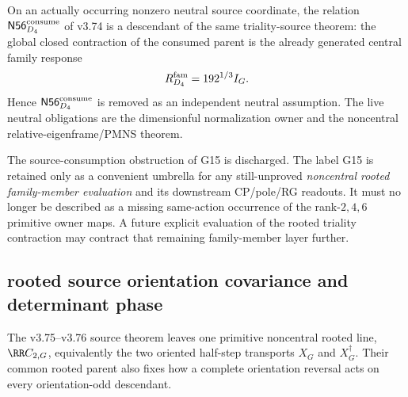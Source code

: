 \documentclass[12pt,a4paper]{article}
\begin{document}
\begin{corollary}[Neutral \(K=56\) consumption is dependent, not independent]
\label{p5:cor:v375-n56-consumption-dependent}
On an actually occurring nonzero neutral source coordinate, the relation
\(\mathsf{N56}_{D_4}^{\rm consume}\) of v3.74 is a descendant of the same
triality-source theorem: the global closed contraction of the consumed parent
is the already generated central family response
\[
 R_{D_4}^{\rm fam}=192^{1/3}I_G.
\]
Hence \(\mathsf{N56}_{D_4}^{\rm consume}\) is removed as an independent
neutral assumption.  The live neutral obligations are the dimensionful
normalization owner and the noncentral relative-eigenframe/PMNS theorem.
\end{corollary}

\begin{remark}
\label{p5:rem:v375-g15-retyped-frontier}
The source-consumption obstruction of G15 is discharged.  The label G15 is
retained only as a convenient umbrella for any still-unproved \emph{noncentral
rooted family-member evaluation} and its downstream CP/pole/RG readouts.  It
must no longer be described as a missing same-action occurrence of the
rank-\(2,4,6\) primitive owner maps.  A future explicit evaluation of the
rooted triality contraction may contract that remaining family-member layer
further.
\end{remark}


\subsection{rooted source orientation covariance and determinant phase}
\label{p5:sec:v378-rooted-source-orientation-covariance}

The v3.75--v3.76 source theorem leaves one primitive noncentral rooted line,
\(\RR C_{2,G}\), equivalently the two oriented half-step transports
\(X_G\) and \(X_G^\dagger\).  Their common rooted parent also fixes how a
complete orientation reversal acts on every orientation-odd descendant.
\end{document}
